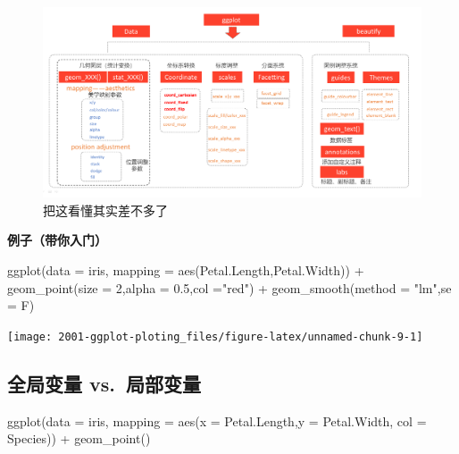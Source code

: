 \documentclass[
]{book}
\newenvironment{Shaded}{\begin{snugshade}}{\end{snugshade}}
\newcommand{\AttributeTok}[1]{\textcolor[rgb]{0.77,0.63,0.00}{#1}}
\newcommand{\DecValTok}[1]{\textcolor[rgb]{0.00,0.00,0.81}{#1}}
\newcommand{\FloatTok}[1]{\textcolor[rgb]{0.00,0.00,0.81}{#1}}
\newcommand{\FunctionTok}[1]{\textcolor[rgb]{0.00,0.00,0.00}{#1}}
\newcommand{\NormalTok}[1]{#1}
\newcommand{\SpecialCharTok}[1]{\textcolor[rgb]{0.00,0.00,0.00}{#1}}
\newcommand{\StringTok}[1]{\textcolor[rgb]{0.31,0.60,0.02}{#1}}
\begin{document}
\begin{figure}
\centering
\includegraphics{figure/22.png}
\caption{把这看懂其实差不多了}
\end{figure}

\textbf{例子（带你入门）}

\begin{Shaded}
\begin{Highlighting}[]
\FunctionTok{ggplot}\NormalTok{(}\AttributeTok{data =}\NormalTok{ iris, }\AttributeTok{mapping =} \FunctionTok{aes}\NormalTok{(Petal.Length,Petal.Width)) }\SpecialCharTok{+}
  \FunctionTok{geom\_point}\NormalTok{(}\AttributeTok{size =} \DecValTok{2}\NormalTok{,}\AttributeTok{alpha =} \FloatTok{0.5}\NormalTok{,}\AttributeTok{col =}\StringTok{"red"}\NormalTok{) }\SpecialCharTok{+}
  \FunctionTok{geom\_smooth}\NormalTok{(}\AttributeTok{method =} \StringTok{"lm"}\NormalTok{,}\AttributeTok{se =}\NormalTok{ F)}
\end{Highlighting}
\end{Shaded}

\begin{center}\texttt{[image: 2001-ggplot-ploting\_files/figure-latex/unnamed-chunk-9-1]} \end{center}

\hypertarget{ux5168ux5c40ux53d8ux91cf-vs.-ux5c40ux90e8ux53d8ux91cf}{%
\subsection{全局变量 vs.~局部变量}\label{ux5168ux5c40ux53d8ux91cf-vs.-ux5c40ux90e8ux53d8ux91cf}}

\begin{Shaded}
\begin{Highlighting}[]
\FunctionTok{ggplot}\NormalTok{(}\AttributeTok{data =}\NormalTok{ iris, }\AttributeTok{mapping =} \FunctionTok{aes}\NormalTok{(}\AttributeTok{x =}\NormalTok{ Petal.Length,}\AttributeTok{y =}\NormalTok{ Petal.Width, }\AttributeTok{col =}\NormalTok{ Species)) }\SpecialCharTok{+}
  \FunctionTok{geom\_point}\NormalTok{() }
\end{Highlighting}
\end{Shaded}
\end{document}
